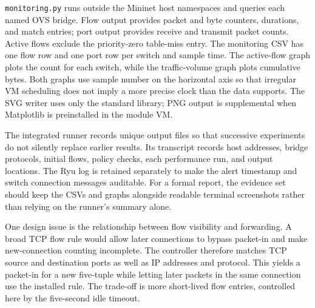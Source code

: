 \texttt{monitoring.py} runs outside the Mininet host namespaces and queries each named OVS bridge. Flow output provides packet and byte counters, durations, and match entries; port output provides receive and transmit packet counts. Active flows exclude the priority-zero table-miss entry. The monitoring CSV has one flow row and one port row per switch and sample time. The active-flow graph plots the count for each switch, while the traffic-volume graph plots cumulative bytes. Both graphs use sample number on the horizontal axis so that irregular VM scheduling does not imply a more precise clock than the data supports. The SVG writer uses only the standard library; PNG output is supplemental when Matplotlib is preinstalled in the module VM.

The integrated runner records unique output files so that successive experiments do not silently replace earlier results. Its transcript records host addresses, bridge protocols, initial flows, policy checks, each performance run, and output locations. The Ryu log is retained separately to make the alert timestamp and switch connection messages auditable. For a formal report, the evidence set should keep the CSVs and graphs alongside readable terminal screenshots rather than relying on the runner's summary alone.

One design issue is the relationship between flow visibility and forwarding. A broad TCP flow rule would allow later connections to bypass packet-in and make new-connection counting incomplete. The controller therefore matches TCP source and destination ports as well as IP addresses and protocol. This yields a packet-in for a new five-tuple while letting later packets in the same connection use the installed rule. The trade-off is more short-lived flow entries, controlled here by the five-second idle timeout.

